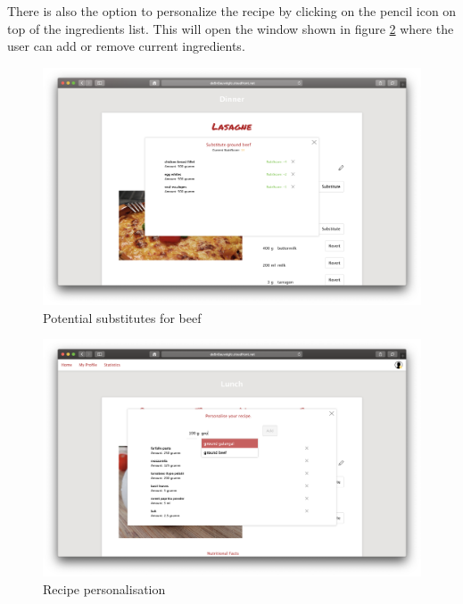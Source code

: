 There is also the option to personalize the recipe by clicking on the pencil icon on top of the ingredients list. This will open the window shown in figure \ref{fig:personalisation} where the user can add or remove current ingredients.

\vspace{-1em}
\begin{figure}[H]
	\captionsetup{justification=centering}
	\begin{center}
		\includegraphics[scale=0.28]{Ressourcen/img/screenshots/screenshotJ.png}
		\vspace{-3em}
		\caption{Potential substitutes for beef}
		\label{fig:substitute}
	\end{center}
\end{figure}

\vspace{-2em}
\begin{figure}[H]
	\captionsetup{justification=centering}
	\begin{center}
		\includegraphics[scale=0.28]{Ressourcen/img/screenshots/screenshotK.png}
		\vspace{-3em}
		\caption{Recipe personalisation}
		\label{fig:personalisation}
	\end{center}
\end{figure}

